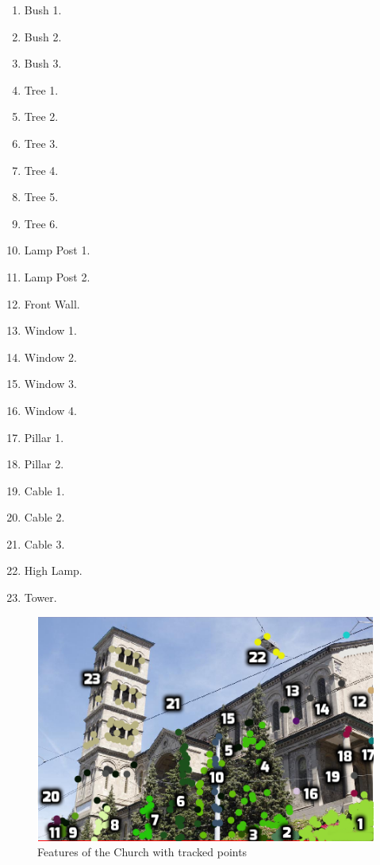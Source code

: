 \begin{enumerate}
\item Bush 1.
\item Bush 2.
\item Bush 3. 
\item Tree 1.
\item Tree 2.
\item Tree 3.
\item Tree 4.
\item Tree 5.
\item Tree 6.
\item Lamp Post 1.
\item Lamp Post 2.
\item Front Wall.
\item Window 1.
\item Window 2. 
\item Window 3. 
\item Window 4.
\item Pillar 1.  
\item Pillar 2. 
\item Cable 1.
\item Cable 2.
\item Cable 3.
\item High Lamp.
\item Tower.
\end{enumerate} 

\begin{figure}[h!]
\centering
\includegraphics[width = 0.9 \textwidth]{./Diagrams/results/data_set/feature_points.png}
\caption{Features of the Church with tracked points}
\label{fig:feature_points}
\end{figure}

